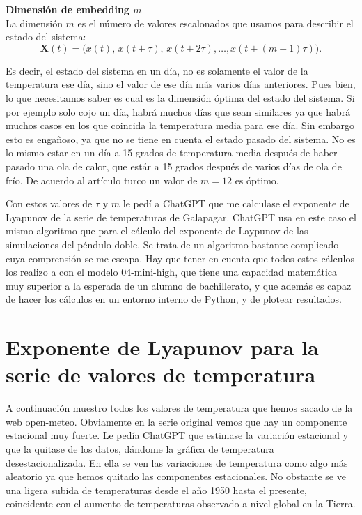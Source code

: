 \documentclass[
  11pt,
  a4paper,
  DIV=11,
  numbers=noendperiod]{scrreprt}
\begin{document}
\textbf{Dimensión de embedding \(m\)}\\
La dimensión \(m\) es el número de valores escalonados que usamos para
describir el estado del sistema:\\
\[
\mathbf X(t)=\bigl(x(t),\,x(t+\tau),\,x(t+2\tau),\dots,x(t+(m-1)\tau)\bigr).
\]

Es decir, el estado del sistema en un día, no es solamente el valor de
la temperatura ese día, sino el valor de ese día más varios días
anteriores. Pues bien, lo que necesitamos saber es cual es la dimensión
óptima del estado del sistema. Si por ejemplo solo cojo un día, habrá
muchos días que sean similares ya que habrá muchos casos en los que
coincida la temperatura media para ese día. Sin embargo esto es
engañoso, ya que no se tiene en cuenta el estado pasado del sistema. No
es lo mismo estar en un día a 15 grados de temperatura media después de
haber pasado una ola de calor, que estár a 15 grados después de varios
días de ola de frío. De acuerdo al artículo turco un valor de \(m=12\)
es óptimo.

Con estos valores de \(\tau\) y \(m\) le pedí a ChatGPT que me calculase
el exponente de Lyapunov de la serie de temperaturas de Galapagar.
ChatGPT usa en este caso el mismo algoritmo que para el cálculo del
exponente de Laypunov de las simulaciones del péndulo doble. Se trata de
un algoritmo bastante complicado cuya comprensión se me escapa. Hay que
tener en cuenta que todos estos cálculos los realizo a con el modelo
04-mini-high, que tiene una capacidad matemática muy superior a la
esperada de un alumno de bachillerato, y que además es capaz de hacer
los cálculos en un entorno interno de Python, y de plotear resultados.

\section{Exponente de Lyapunov para la serie de valores de
temperatura}\label{exponente-de-lyapunov-para-la-serie-de-valores-de-temperatura}

A continuación muestro todos los valores de temperatura que hemos sacado
de la web open-meteo. Obviamente en la serie original vemos que hay un
componente estacional muy fuerte. Le pedía ChatGPT que estimase la
variación estacional y que la quitase de los datos, dándome la gráfica
de temperatura desestacionalizada. En ella se ven las variaciones de
temperatura como algo más aleatorio ya que hemos quitado las componentes
estacionales. No obstante se ve una ligera subida de temperaturas desde
el año 1950 hasta el presente, coincidente con el aumento de
temperaturas observado a nivel global en la Tierra.
\end{document}
